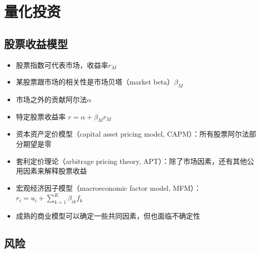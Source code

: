 \documentclass[
]{book}
\providecommand{\tightlist}{%
  \setlength{\itemsep}{0pt}\setlength{\parskip}{0pt}}
\begin{document}
\hypertarget{qi}{%
\chapter{量化投资}\label{qi}}

\hypertarget{ux80a1ux7968ux6536ux76caux6a21ux578b}{%
\section{股票收益模型}\label{ux80a1ux7968ux6536ux76caux6a21ux578b}}

\begin{itemize}
\tightlist
\item
  股票指数可代表市场，收益率\(r_M\)
\item
  某股票跟市场的相关性是市场贝塔（market beta）\(\beta_M\)
\item
  市场之外的贡献阿尔法\(\alpha\)
\item
  特定股票收益率 \(r = \alpha + \beta_M r_M\)
\item
  资本资产定价模型（capital asset pricing model, CAPM）：所有股票阿尔法部分期望是零
\item
  套利定价理论（arbitrage pricing theory, APT）：除了市场因素，还有其他公用因素来解释股票收益
\item
  宏观经济因子模型（macroeconomic factor model, MFM）：\(r_i = u_i+\sum_{k=1}^{K}\beta_{ik}f_k\)
\item
  成熟的商业模型可以确定一些共同因素，但也面临不确定性
\end{itemize}

\hypertarget{ux98ceux9669}{%
\section{风险}\label{ux98ceux9669}}
\end{document}
